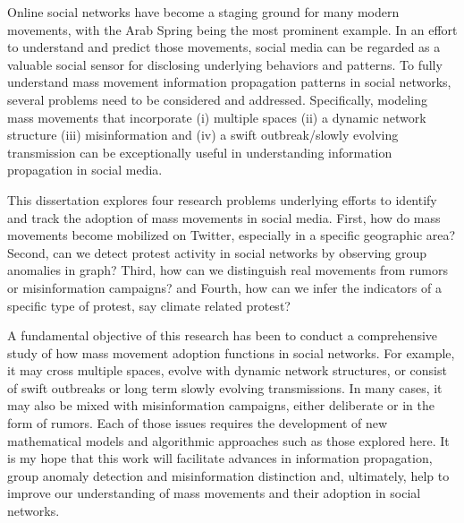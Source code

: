 \documentclass[12pt,dvips]{report}
\begin{document}
Online social networks have become a staging ground for many modern movements, with the Arab Spring being the most prominent example. In an effort to understand and predict those movements, social media can be regarded as a valuable social sensor for disclosing underlying behaviors and patterns. To fully understand mass movement information propagation patterns in social networks, several problems need to be considered and addressed. Specifically, modeling mass movements that incorporate (i) multiple spaces (ii) a dynamic network structure (iii) misinformation and (iv) a swift outbreak/slowly evolving transmission can be exceptionally useful in understanding information propagation in social media.

This dissertation explores four research problems underlying efforts to identify and track the adoption of mass movements in social media. First, how do mass movements become mobilized on Twitter, especially in a specific geographic area? Second, can we detect protest activity in social networks by observing group anomalies in graph? Third, how can we distinguish real movements from rumors or misinformation campaigns? and Fourth, how can we infer the indicators of a specific type of protest, say climate related protest?

A fundamental objective of this research has been to conduct a comprehensive study of how mass movement adoption functions in social networks. For example, it may cross multiple spaces, evolve with dynamic network structures, or consist of swift outbreaks or long term slowly evolving transmissions. In many cases, it may also be mixed with misinformation campaigns, either deliberate or in the form of rumors. Each of those issues requires the development of new mathematical models and algorithmic approaches such as those explored here.  It is my hope that this work will facilitate advances in information propagation, group anomaly detection and misinformation distinction and, ultimately, help to improve our understanding of mass movements and their adoption in social networks.
\end{document}
